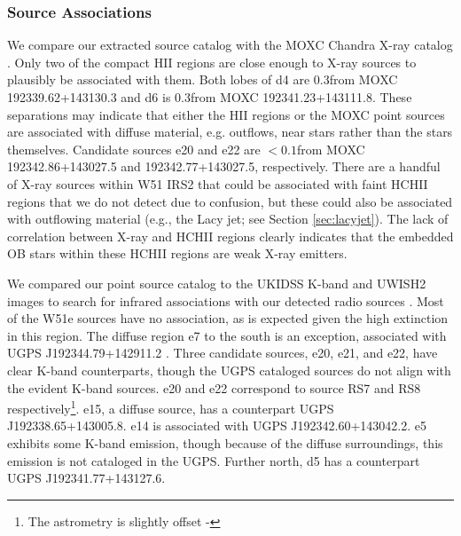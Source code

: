 \subsubsection{Source Associations}
\label{sec:associations}
We compare our extracted source catalog with the MOXC Chandra X-ray catalog
\citep{Townsley2014a}.  Only two of the compact HII regions are close enough to
X-ray sources to plausibly be associated with them.  Both lobes of d4 are
0.3\arcsec from MOXC 192339.62+143130.3 and d6 is 0.3\arcsec from MOXC
192341.23+143111.8.    These
separations may indicate that either the HII regions or the MOXC point sources
are associated with diffuse material, e.g. outflows,
near stars rather than the stars themselves.  
Candidate sources e20 and e22 are $<0.1$\arcsec from
MOXC 192342.86+143027.5 and 192342.77+143027.5, respectively.
There are a handful of X-ray
sources within W51 IRS2 that could be associated with faint HCHII regions that
we do not detect due to confusion, but these could also be associated with
outflowing material (e.g., the Lacy jet; see Section \ref{sec:lacyjet}).  The
lack of correlation between X-ray and HCHII regions clearly indicates that the
embedded OB stars within these HCHII regions are weak X-ray emitters.  

We compared our point source catalog to the UKIDSS K-band and UWISH2 \hh images to
search for infrared associations with our detected radio sources
\citep{Lucas2008a,Froebrich2011a}.  Most of the W51e sources have no
association, as is expected given the high extinction in this region.  The
diffuse region e7 to the south is an exception, associated with UGPS
J192344.79+142911.2 \citep{Lucas2008a}.  Three candidate sources, e20, e21, and
e22, have clear K-band counterparts, though the UGPS cataloged sources do not align
with the evident K-band sources.  e20 and e22 correspond to \citet{Goldader1994a}
source RS7 and RS8 respectively\footnote{The \citet{Goldader1994a} astrometry
is slightly offset - }.  e15, a diffuse source, has a counterpart UGPS
J192338.65+143005.8.  e14 is associated with UGPS J192342.60+143042.2.  e5
exhibits some K-band emission, though because of the diffuse surroundings,
this emission is not cataloged in the UGPS.
Further north, d5 has a counterpart UGPS J192341.77+143127.6.



